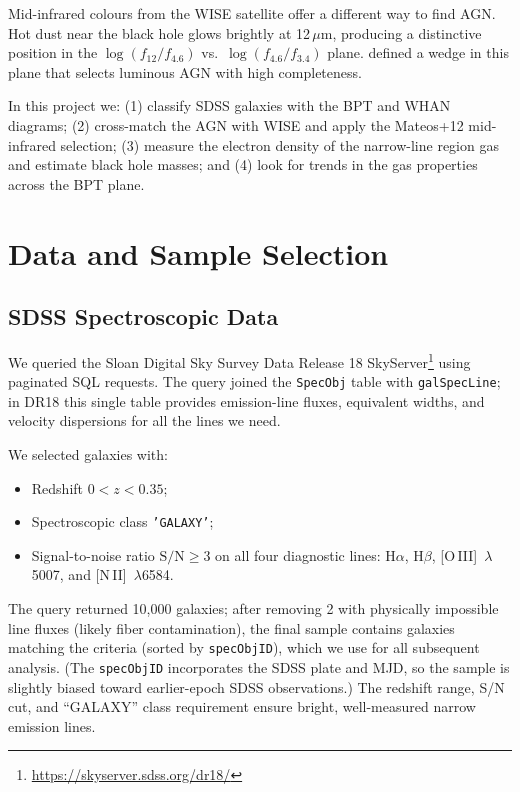 \documentclass[a4paper,12pt]{article}
\begin{document}
Mid-infrared colours from the WISE satellite \citep{wright2010} offer a
different way to find AGN.  Hot dust near the black hole glows brightly
at 12\,$\mu$m, producing a distinctive position in the
$\log(f_{12}/f_{4.6})$ vs.\ $\log(f_{4.6}/f_{3.4})$ plane.
\citet{mateos2012} defined a wedge in this plane that selects luminous
AGN with high completeness.

In this project we: (1) classify \samplesize{} SDSS galaxies with the BPT and
WHAN diagrams; (2) cross-match the AGN with WISE and apply the Mateos+12
mid-infrared selection; (3) measure the electron density of the
narrow-line region gas and estimate black hole masses; and (4) look for
trends in the gas properties across the BPT plane.

\section{Data and Sample Selection}
\label{sec:data}

\subsection{SDSS Spectroscopic Data}

We queried the Sloan Digital Sky Survey Data Release 18
SkyServer\footnote{\url{https://skyserver.sdss.org/dr18/}} using
paginated SQL requests.  The query joined the \texttt{SpecObj} table
with \texttt{galSpecLine}; in DR18 this single table provides
emission-line fluxes, equivalent widths, and velocity dispersions for
all the lines we need.

We selected galaxies with:
\begin{itemize}
  \item Redshift $0 < z < 0.35$;
  \item Spectroscopic class \texttt{'GALAXY'};
  \item Signal-to-noise ratio $\mathrm{S/N} \ge 3$ on all four
        diagnostic lines: H$\alpha$, H$\beta$,
        [O\,III]~$\lambda$5007, and [N\,II]~$\lambda$6584.
\end{itemize}

The query returned 10,000 galaxies; after removing 2 with physically
impossible line fluxes (likely fiber contamination), the final sample
contains \samplesize{} galaxies matching the criteria
(sorted by \texttt{specObjID}), which we use for all
subsequent analysis.  (The \texttt{specObjID} incorporates the
SDSS plate and MJD, so the sample is slightly biased toward
earlier-epoch SDSS observations.)  The redshift range, S/N cut, and
``GALAXY'' class requirement ensure bright, well-measured narrow
emission lines.
\end{document}
